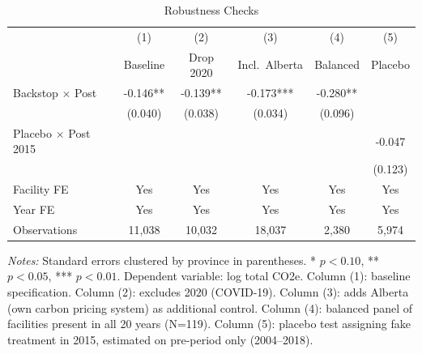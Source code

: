 \begin{table}[htbp]
\centering
\caption{Robustness Checks}
\label{tab:robust}
\begin{tabular}{l ccccc}
\hline\hline
 & (1) & (2) & (3) & (4) & (5) \\
 & Baseline & Drop 2020 & Incl.\ Alberta & Balanced & Placebo \\
\hline
Backstop $\times$ Post & -0.146** & -0.139** & -0.173*** & -0.280** & \\
 & (0.040) & (0.038) & (0.034) & (0.096) & \\[6pt]
Placebo $\times$ Post 2015 & & & & & -0.047 \\
 & & & & & (0.123) \\[6pt]
\hline
Facility FE & Yes & Yes & Yes & Yes & Yes \\
Year FE & Yes & Yes & Yes & Yes & Yes \\
Observations & 11,038 & 10,032 & 18,037 & 2,380 & 5,974 \\
\hline\hline
\end{tabular}
\begin{minipage}{0.95\textwidth}
\footnotesize
\textit{Notes:} Standard errors clustered by province in parentheses. * $p<0.10$, ** $p<0.05$, *** $p<0.01$. Dependent variable: log total CO2e. Column (1): baseline specification. Column (2): excludes 2020 (COVID-19). Column (3): adds Alberta (own carbon pricing system) as additional control. Column (4): balanced panel of facilities present in all 20 years (N=119). Column (5): placebo test assigning fake treatment in 2015, estimated on pre-period only (2004--2018).
\end{minipage}
\end{table}
